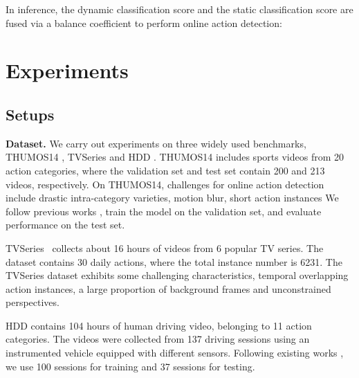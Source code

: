 \documentclass[10pt,twocolumn,letterpaper]{article}
\begin{document}
In inference, the dynamic classification score  and the static classification score  are fused via a balance coefficient  to perform online action detection:


\section{Experiments}

\subsection{Setups}

\textbf{Dataset.} We carry out experiments on three widely used benchmarks, THUMOS14 \cite{THUMOS14}, TVSeries \cite{de2016online} and HDD \cite{ramanishka2018toward}. THUMOS14 \cite{THUMOS14} includes sports videos from 20 action categories, where the validation set and test set contain 200 and 213 videos, respectively. On THUMOS14, challenges for online action detection include drastic intra-category varieties, motion blur, short action instances \etc We follow previous works \cite{de2018modeling, xu2019temporal, eun2020learning, wang2021oadtr}, train the model on the validation set, and evaluate performance on the test set.

TVSeries~\cite{de2016online} collects about 16 hours of videos from 6 popular TV series. The dataset contains 30 daily actions, where the total instance number is 6231. The TVSeries dataset exhibits some challenging characteristics, \eg temporal overlapping action instances, a large proportion of background frames and unconstrained perspectives.

HDD \cite{ramanishka2018toward} contains 104 hours of human driving video, belonging to 11 action categories. The videos were collected from 137 driving sessions using an instrumented vehicle equipped with different sensors. Following existing works \cite{de2018modeling, xu2019temporal, wang2021oadtr}, we use 100 sessions for training and 37 sessions for testing.
\end{document}
